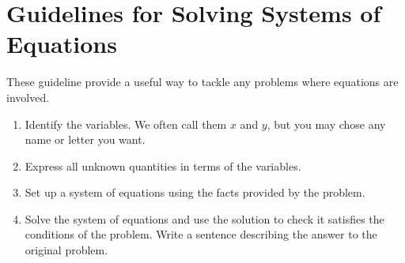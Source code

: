  \section*{Guidelines for Solving Systems of Equations}
 These guideline provide a useful way to tackle any problems where equations are involved. 
 \begin{tcolorbox}
 	
  \begin{enumerate}\setlength\itemsep{0em}
 	\item Identify the variables. We often call them $x$ and $y$, but you may chose any name or letter you want. 	
 	\item Express all unknown quantities in terms of the variables. 	
 	\item Set up a system of equations using the facts provided by the problem.	
 	\item Solve the system of equations and use the solution to check it satisfies the conditions of the
 	problem. Write a sentence describing the answer to the original problem.  
 \end{enumerate}
\end{tcolorbox}
 
